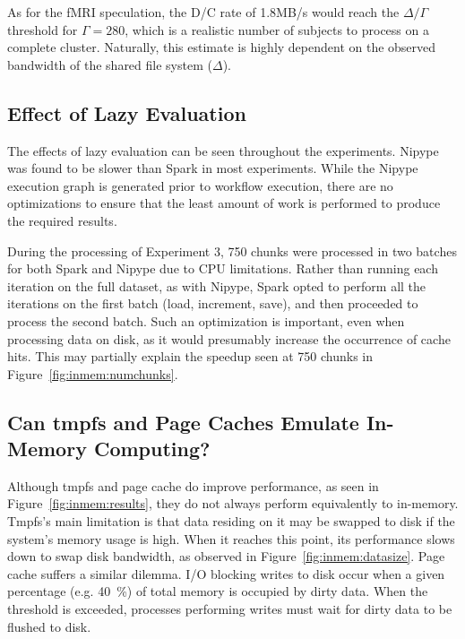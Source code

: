 As for the fMRI speculation, the D/C rate of 1.8MB/s would reach the
$\Delta/\Gamma$ threshold for $\Gamma=280$, which is a realistic number of
subjects to process on a complete cluster. Naturally, this estimate is highly
dependent on the observed bandwidth of the shared file system ($\Delta$).

\subsection{Effect of Lazy Evaluation}

The effects of lazy evaluation can be seen throughout the experiments. Nipype
was found to be slower than Spark in most experiments. While the Nipype
execution graph is generated prior to workflow execution, there are no
optimizations to ensure that the least amount of work is performed to produce
the required results. 

During the processing of Experiment 3, 750 chunks were processed in two batches
for both Spark and Nipype due to CPU limitations. Rather than running each
iteration on the full dataset, as with Nipype, Spark opted to perform all the
iterations on the first batch (load, increment, save), and then proceeded to
process the second batch. Such an optimization is important, even when
processing data on disk, as it would presumably increase the occurrence of cache
hits. This may partially explain the speedup seen at 750 chunks in
Figure~\ref{fig:inmem:numchunks}.%

\subsection{Can tmpfs and Page Caches Emulate In-Memory Computing?}

Although tmpfs and page cache do improve performance, as seen in
Figure~\ref{fig:inmem:results}, they do not always perform equivalently to in-memory.
Tmpfs's main limitation is that data residing on it may be swapped to disk if
the system's memory usage is high. When it reaches this point, its performance
slows down to swap disk bandwidth, as observed in Figure~\ref{fig:inmem:datasize}.
Page cache suffers a similar dilemma. I/O blocking writes to disk occur when a
given percentage (e.g. 40~\%) of total memory is occupied by dirty data. When
the threshold is exceeded, processes performing writes must wait for dirty data
to be flushed to disk.

